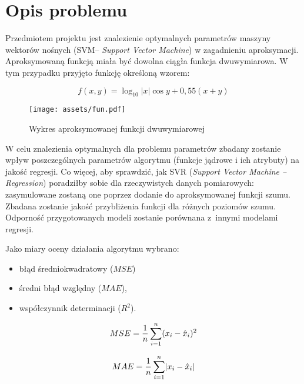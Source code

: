 \section{Opis problemu}
\label{sec:problem}

Przedmiotem projektu jest znalezienie optymalnych parametrów maszyny wektorów nośnych (SVM-- \textit{Support Vector Machine}) w zagadnieniu aproksymacji. Aproksymowaną funkcją miała być dowolna ciągła funkcja dwuwymiarowa. W tym przypadku przyjęto funkcję określoną wzorem:

\begin{equation}
    \label{eqn:fun}
    f(x,y) = \log_{10}{|x|} \cos{y} + 0,55(x+y)
\end{equation}
\smallskip

\begin{figure}[h]
    \centering
    \texttt{[image: assets/fun.pdf]}
    \caption{Wykres aproksymowanej funkcji dwuwymiarowej}
    \label{fig:fun}
\end{figure}

W celu znalezienia optymalnych dla problemu parametrów zbadany zostanie wpływ poszczególnych parametrów algorytmu (funkcje jądrowe i ich atrybuty) na jakość regresji. Co więcej, aby sprawdzić, jak SVR (\textit{Support Vector Machine -- Regression}) poradziłby sobie dla rzeczywistych danych pomiarowych: zasymulowane zostaną one poprzez dodanie do aproksymowanej funkcji szumu. Zbadana zostanie jakość przybliżenia funkcji dla różnych poziomów szumu. Odporność przygotowanych modeli zostanie porównana z~innymi modelami regresji.

Jako miary oceny działania algorytmu wybrano:
\begin{itemize}
    \item błąd średniokwadratowy ($MSE$)
    \item średni błąd względny ($MAE$),
    \item współczynnik determinacji ($R^2$).
\end{itemize}

\begin{equation}
    \label{eqn:mse}
    MSE =\frac{1}{n} \sum_{i=1}^n (x_{i}-\hat{x}_{i})^2 \\[2ex]
\end{equation}
        
\begin{equation}
    \label{eqn:mae}
    MAE =\frac{1}{n} \sum_{i=1}^n \lvert x_{i}-\hat{x}_{i} \rvert \\[2ex]
\end{equation}
        
